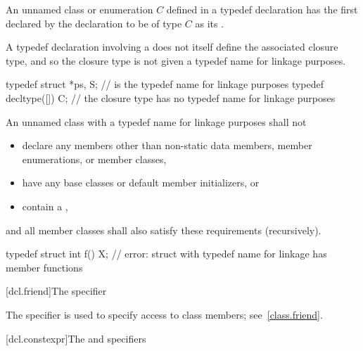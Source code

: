 \pnum
{}%
%
%
An unnamed class or enumeration $C$ defined in a typedef declaration has
the first 
declared by the declaration to be of type $C$
as its .
\begin{note}
A typedef declaration involving a 
does not itself define the associated closure type,
and so the closure type is not given a typedef name for linkage purposes.
\end{note}
\begin{example}
\begin{codeblock}
typedef struct { } *ps, S;      //  is the typedef name for linkage purposes
typedef decltype([]{}) C;       // the closure type has no typedef name for linkage purposes
\end{codeblock}
\end{example}

\pnum
An unnamed class with a typedef name for linkage purposes shall not
\begin{itemize}
\item
  declare any members
  other than non-static data members, member enumerations, or member classes,
\item
  have any base classes or default member initializers, or
\item
  contain a ,
\end{itemize}
and all member classes shall also satisfy these requirements (recursively).
\begin{example}
\begin{codeblock}
typedef struct {
  int f() {}
} X;                            // error: struct with typedef name for linkage has member functions
\end{codeblock}
\end{example}

[dcl.friend]{The  specifier}%

\pnum
The  specifier is used to specify access to class members;
see~\ref{class.friend}.

[dcl.constexpr]{The  and  specifiers}%

